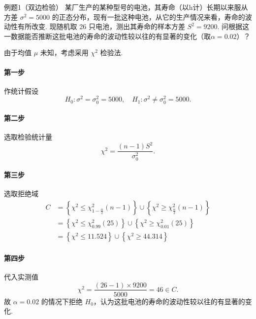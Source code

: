 \begin{question}{例题1（双边检验）}
    某厂生产的某种型号的电池，其寿命（以h计）长期以来服从方差 $\sigma^2=5000$ 的正态分布，现有一批这种电池，从它的生产情况来看，寿命的波动性有所改变. 现随机取 26 只电池，测出其寿命的样本方差 $S^2=9200$. 问根据这一数据能否推断这批电池的寿命的波动性较以往的有显著的变化（取$\alpha=0.02$）？
\end{question}
\begin{solution}
    由于均值 $\mu$ 未知，考虑采用 $\chi^2$ 检验法.
    \paragraph{第一步} 作统计假设
    $$
        H_0:\sigma^2 = \sigma_0^2 = 5000, \quad H_1:\sigma^2\neq\sigma_0^2 = 5000.
    $$
    \paragraph{第二步} 选取检验统计量
    $$
        \chi^2 = \frac{(n-1)S^2}{\sigma_0^2}.
    $$
    \paragraph{第三步} 选取拒绝域
    $$
        \begin{aligned}
            C
             & = \left\{\chi^2 \leqslant \chi_{1-\frac{\alpha}{2}}^2(n-1)\right\} \cup \left\{\chi^2 \geqslant \chi_{\frac{\alpha}{2}}^2(n-1)\right\} \\
             & = \left\{\chi^2 \leqslant \chi_{0.99}^2(25)\right\} \cup \left\{\chi^2 \geqslant \chi_{0.01}^2(25)\right\}                             \\
             & = \left\{\chi^2 \leqslant 11.524\right\} \cup \left\{\chi^2 \geqslant 44.314\right\}
        \end{aligned}
    $$
    \paragraph{第四步} 代入实测值
    $$
        \chi^2 = \frac{(26-1) \times 9200}{5000} = 46 \in C.
    $$
    故 $\alpha = 0.02$ 的情况下拒绝 $H_0$，认为这批电池的寿命的波动性较以往的有显著的变化.
\end{solution}




